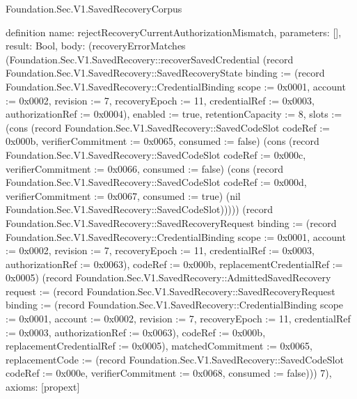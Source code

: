 \begin{lexlean}{Foundation.Sec.V1.SavedRecoveryCorpus}
\begin{semanticmodule}
definition{
  name: rejectRecoveryCurrentAuthorizationMismatch,
  parameters: [],
  result: Bool,
  body: (recoveryErrorMatches (Foundation.Sec.V1.SavedRecovery::recoverSavedCredential (record Foundation.Sec.V1.SavedRecovery::SavedRecoveryState {binding := (record Foundation.Sec.V1.SavedRecovery::CredentialBinding {scope := 0x0001, account := 0x0002, revision := 7, recoveryEpoch := 11, credentialRef := 0x0003, authorizationRef := 0x0004}), enabled := true, retentionCapacity := 8, slots := (cons (record Foundation.Sec.V1.SavedRecovery::SavedCodeSlot {codeRef := 0x000b, verifierCommitment := 0x0065, consumed := false}) (cons (record Foundation.Sec.V1.SavedRecovery::SavedCodeSlot {codeRef := 0x000c, verifierCommitment := 0x0066, consumed := false}) (cons (record Foundation.Sec.V1.SavedRecovery::SavedCodeSlot {codeRef := 0x000d, verifierCommitment := 0x0067, consumed := true}) (nil Foundation.Sec.V1.SavedRecovery::SavedCodeSlot))))}) (record Foundation.Sec.V1.SavedRecovery::SavedRecoveryRequest {binding := (record Foundation.Sec.V1.SavedRecovery::CredentialBinding {scope := 0x0001, account := 0x0002, revision := 7, recoveryEpoch := 11, credentialRef := 0x0003, authorizationRef := 0x0063}), codeRef := 0x000b, replacementCredentialRef := 0x0005}) (record Foundation.Sec.V1.SavedRecovery::AdmittedSavedRecovery {request := (record Foundation.Sec.V1.SavedRecovery::SavedRecoveryRequest {binding := (record Foundation.Sec.V1.SavedRecovery::CredentialBinding {scope := 0x0001, account := 0x0002, revision := 7, recoveryEpoch := 11, credentialRef := 0x0003, authorizationRef := 0x0063}), codeRef := 0x000b, replacementCredentialRef := 0x0005}), matchedCommitment := 0x0065, replacementCode := (record Foundation.Sec.V1.SavedRecovery::SavedCodeSlot {codeRef := 0x000e, verifierCommitment := 0x0068, consumed := false})})) 7),
  axioms: [propext]
}


\end{semanticmodule}
\end{lexlean}
